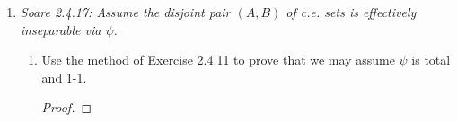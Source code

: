 \documentclass{article}
\begin{document}
\begin{enumerate}[label={\bf Q\arabic*:}]
\begin{proof}
      Once again, we can construct $g$ via the SMN theorem, by first
      constructing another function $\varphi_{g(e)}(x)$ that outputs
      0 if $x\in\text{range}(\varphi_e)$ and that does not halt otherwise.
    \end{proof}

  \item \it Soare 2.4.17: Assume the disjoint pair $(A,B)$ of c.e. sets is
    effectively inseparable via $\psi$.
    \begin{enumerate}[label={(\roman*)}]
      \item Use the method of Exercise 2.4.11 to prove that we may assume
        $\psi$ is total and 1-1.

        \begin{proof}



\end{proof}
\end{enumerate}
\end{enumerate}
\end{document}
